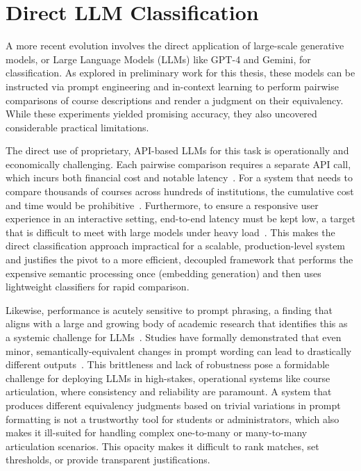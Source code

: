 \section{Direct LLM Classification}\label{ch:2.4}
A more recent evolution involves the direct application of large-scale generative models, or Large Language Models (LLMs) like GPT-4 and Gemini, for classification.  As explored in preliminary work for this thesis, these models can be instructed via prompt engineering and in-context learning to perform pairwise comparisons of course descriptions and render a judgment on their equivalency.  While these experiments yielded promising accuracy, they also uncovered considerable practical limitations.

The direct use of proprietary, API-based LLMs for this task is operationally and economically challenging. Each pairwise comparison requires a separate API call, which incurs both financial cost and notable latency~\cite{Sharma_2025,nvidia_2025}. For a system that needs to compare thousands of courses across hundreds of institutions, the cumulative cost and time would be prohibitive~\cite{Sharma_2025,nvidia_2025}. Furthermore, to ensure a responsive user experience in an interactive setting, end-to-end latency must be kept low, a target that is difficult to meet with large models under heavy load~\cite{nvidia_2025,Sharma_2025}. This makes the direct classification approach impractical for a scalable, production-level system and justifies the pivot to a more efficient, decoupled framework that performs the expensive semantic processing once (embedding generation) and then uses lightweight classifiers for rapid comparison.

Likewise, performance is acutely sensitive to prompt phrasing, a finding that aligns with a large and growing body of academic research that identifies this as a systemic challenge for LLMs~\cite{razavi2025benchmarkingpromptsensitivitylarge,zhuo-etal-2024-prosa}. Studies have formally demonstrated that even minor, semantically-equivalent changes in prompt wording can lead to drastically different outputs~\cite{razavi2025benchmarkingpromptsensitivitylarge,zhuo-etal-2024-prosa}. This brittleness and lack of robustness pose a formidable challenge for deploying LLMs in high-stakes, operational systems like course articulation, where consistency and reliability are paramount. A system that produces different equivalency judgments based on trivial variations in prompt formatting is not a trustworthy tool for students or administrators, which also makes it ill-suited for handling complex one-to-many or many-to-many articulation scenarios.  This opacity makes it difficult to rank matches, set thresholds, or provide transparent justifications.

